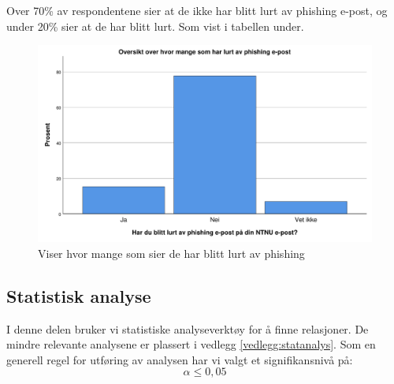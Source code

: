 Over 70\% av respondentene sier at de ikke har blitt lurt av phishing e-post, og under 20\% sier at de har blitt lurt. Som vist i tabellen under. 
\begin{figure}[H]
    \centering
    \includegraphics[scale=0.5]{case_2/bilder/spss/lurt_phish.pdf}
    \caption[Lurt av phishing]{Viser hvor mange som sier de har blitt lurt av phishing}
    \label{fig:lurt-av-phishing}
\end{figure}

\subsection{Statistisk analyse}
I denne delen bruker vi statistiske analyseverktøy for å finne relasjoner. De mindre relevante analysene er plassert i vedlegg \ref{vedlegg:statanalys}. Som en generell regel for utføring av analysen har vi valgt et signifikansnivå på: \[\alpha \leq 0,05\]

